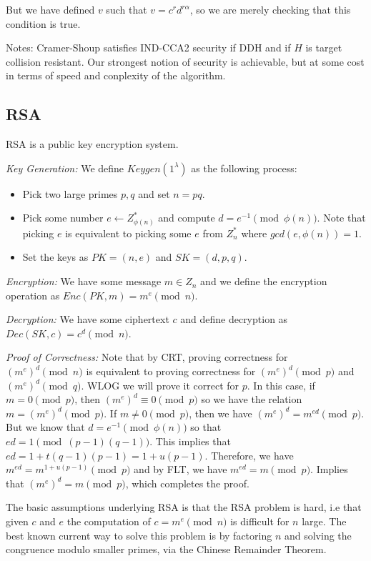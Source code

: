 \documentclass[psamsfonts]{amsart}
\begin{document}
But we have defined $v$ such that $v = c^r d^{r \alpha}$, so we are merely checking that this condition is true.

Notes: Cramer-Shoup satisfies IND-CCA2 security if DDH and if $H$ is target collision resistant. Our strongest notion of security is achievable, but at some cost in terms of speed and conplexity of the algorithm.

\subsection{RSA}

RSA is a public key encryption system.

\emph{Key Generation:} We define $Keygen(1^\lambda)$ as the following process:
\begin{itemize}
  \item Pick two large primes $p,q$ and set $n = pq$.
  \item Pick some number $e \leftarrow Z_{\phi(n)}^*$ and compute $d = e^{-1} \pmod{\phi(n)}$. Note that picking $e$ is equivalent to picking some $e$ from $Z_n^*$ where $gcd(e, \phi(n)) = 1$.
  \item Set the keys as $PK = (n, e)$ and $SK = (d, p, q)$.
\end{itemize}

\emph{Encryption:} We have some message $m \in Z_n$ and we define the encryption operation as $Enc(PK, m) = m^e \pmod{n}$.

\emph{Decryption:} We have some ciphertext $c$ and define decryption as $Dec(SK, c) = c^d \pmod{n}$.

\emph{Proof of Correctness:} Note that by CRT, proving correctness for $(m^e)^d \pmod{n}$ is equivalent to proving correctness for $(m^e)^d \pmod{p}$ and $(m^e)^d \pmod{q}$. WLOG we will prove it correct for $p$. In this case, if $m = 0 \pmod{p}$, then $(m^e)^d \equiv 0 \pmod{p}$ so we have the relation $m = (m^e)^d \pmod{p}$. If $m \neq 0 \pmod{p}$, then we have $(m^e)^d = m^{ed} \pmod{p}$. But we know that $d = e^{-1} \pmod{\phi(n)}$ so that $ed = 1 \pmod{(p-1)(q-1)}$. This implies that $ed = 1 + t(q-1)(p-1) = 1 + u(p-1)$. Therefore, we have $m^{ed} = m^{1+u(p-1)} \pmod{p}$ and by FLT, we have $m^{ed} = m \pmod{p}$. Implies that $(m^e)^d = m \pmod{p}$, which completes the proof.

The basic assumptions underlying RSA is that the RSA problem is hard, i.e that given $c$ and $e$ the computation of $c = m^e \pmod{n}$ is difficult for $n$ large. The best known current way to solve this problem is by factoring $n$ and solving the congruence modulo smaller primes, via the Chinese Remainder Theorem.
\end{document}
